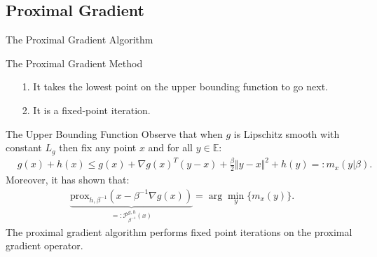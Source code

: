 \documentclass[11pt]{beamer}
\begin{document}
    \subsection{Proximal Gradient}
        \begin{frame}{The Proximal Gradient Algorithm}
            \begin{block}{The Proximal Gradient Method}
                \begin{algorithm}[H]
                    \scriptsize
                    \begin{algorithmic}[1]
                        \ENDIF
                    \ENDFOR
                    \end{algorithmic}
                    \caption{Proximal Gradient With Fixed Step-sizes}
                    \label{alg:1}
                \end{algorithm}
            \end{block}
            \begin{itemize}
                \item [1.] It takes the lowest point on the upper bounding function to go next. 
                \item [2.] It is a fixed-point iteration.
            \end{itemize}
        \end{frame}
        \begin{frame}{The Upper Bounding Function}
            Observe that when $g$ is Lipschitz smooth with constant $L_g$ then fix any point $x$ and for all $y\in \mathbb E$:  
            \begin{align*}
                & g(x) + h(x) \le 
                g(x) + \nabla g(x)^T(y - x) + \frac{\beta}{2} \Vert y - x\Vert^2
                + h(y) =: m_x(y|\beta). 
            \end{align*}
            Moreover, it has shown that: 
            \begin{align*}
                \underbrace{\text{prox}_{h, \beta^{-1}}(x - \beta^{-1}\nabla g(x))}_{=:\mathcal P_{\beta^{-1}}^{g, h}(x)} 
                = \arg\min_{y} \{m_x(y)\}.  
            \end{align*}
            The proximal gradient algorithm performs fixed point iterations on the proximal gradient operator. 
        \end{frame}
\end{document}
